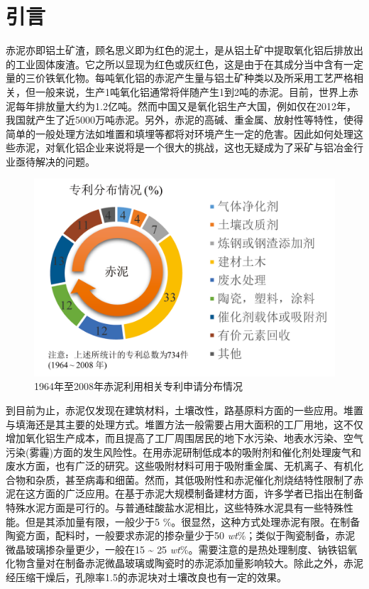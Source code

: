 \chapter{引言}
赤泥亦即铝土矿渣，顾名思义即为红色的泥土，是从铝土矿中提取氧化铝后排放出的工业固体废渣。它之所以显现为红色或灰红色，这是由于在其成分当中含有一定量的三价铁氧化物。每吨氧化铝的赤泥产生量与铝土矿种类以及所采用工艺严格相关，但一般来说，生产1吨氧化铝通常将伴随产生1到2吨的赤泥\cite{cao2013phase,ayres2001materials}。目前，世界上赤泥每年排放量大约为1.2亿吨。然而中国又是氧化铝生产大国，例如仅在2012年，我国就产生了近5000万吨赤泥\cite{klauber2011bauxite}。另外，赤泥的高碱、重金属、放射性等特性，使得简单的一般处理方法如堆置和填埋等都将对环境产生一定的危害。因此如何处理这些赤泥，对氧化铝企业来说将是一个很大的挑战，这也无疑成为了采矿与铝冶金行业亟待解决的问题。

\begin{figure}[!h]
	\centering
	\vspace{5pt}
	\includegraphics[width=0.65\linewidth]{Figures/c1/Figure1}
	\caption{1964年至2008年赤泥利用相关专利申请分布情况}\label{patentdistribution}
\end{figure}

到目前为止，赤泥仅发现在建筑材料，土壤改性，路基原料方面的一些应用。堆置与填海还是其主要的处理方式\cite{piga1993recovering}。堆置方法一般需要占用大面积的工厂用地，这不仅增加氧化铝生产成本，而且提高了工厂周围居民的地下水污染、地表水污染、空气污染(雾霾)方面的发生风险性\cite{dauvin2010towards,varnavas1995factors}。在用赤泥研制低成本的吸附剂和催化剂处理废气和废水方面，也有广泛的研究\cite{crini2006non,jones2006carbon,pratt1982hydrogenation,sahu2013removal}。这些吸附材料可用于吸附重金属、无机离子、有机化合物和杂质，甚至病毒和细菌\cite{bhatnagar2011review,liu2009review}。然而，其低吸附性和赤泥催化剂烧结特性限制了赤泥在这方面的广泛应用。在基于赤泥大规模制备建材方面，许多学者已指出在制备特殊水泥方面是可行的\cite{singh1997preparation,manfroi2014microstructure,tsakiridis2004red}。与普通硅酸盐水泥相比，这些特殊水泥具有一些特殊性能。但是其添加量有限，一般少于5 \%\cite{tsakiridis2004red}。很显然，这种方式处理赤泥有限。在制备陶瓷方面，配料时，一般要求赤泥的掺杂量少于50 \textit{wt}\%\cite{sglavo2000bauxite}；类似于陶瓷制备，赤泥微晶玻璃掺杂量更少，一般在15 \textasciitilde{ }25 \textit{wt}\%\cite{pelino1994crystallization}。需要注意的是热处理制度、钠铁铝氧化物含量对在制备赤泥微晶玻璃或陶瓷时的赤泥添加量影响较大\cite{yang2008preparation,liu2016red}。除此之外，赤泥经压缩干燥后，孔隙率1.5的赤泥块对土壤改良也有一定的效果\cite{liu2015metallurgical}。

